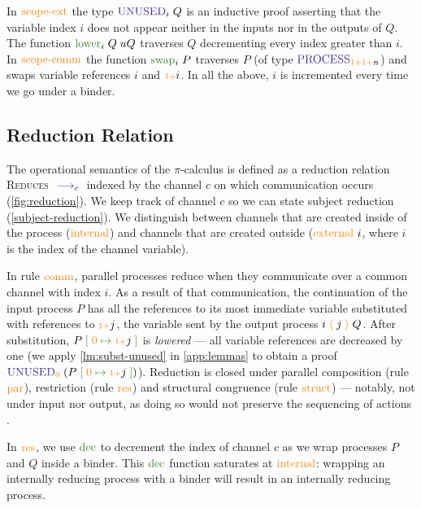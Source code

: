 \documentclass[a4paper,UKenglish,cleveref,autoref,thm-restate,authorcolumns]{lipics-v2019}
\theoremstyle{definition}
\newcommand{\picalc}{$\pi$-calculus}
\newcommand{\type}[1]{\textcolor{BlueViolet}{\operatorname{#1}}}
\newcommand{\constr}[1]{\textcolor{BurntOrange}{\operatorname{#1}}}
\newcommand{\func}[1]{\textcolor{OliveGreen}{\operatorname{#1}}}
\newcommand{\send}[2]{#1 \; \constr{\langle} \; #2 \;\constr{\rangle} \;}
\newcommand{\suc}{\constr{\scriptstyle 1+}}
\newcommand{\subst}[3]{#1 \; \func{[} \; #3 \; \func{\mapsto} \;#2 \; \func{]}}
\newcommand{\reduce}[1]{\; \type{\longrightarrow}_{#1} \;}
\newcommand{\Process}{\type{PROCESS}}
\newcommand{\Unused}{\type{UNUSED}}
\begin{document}
In $\constr{scope-ext}$ the type $\Unused_i \; Q$ is an inductive proof asserting that the variable index $i$ does not appear neither in the inputs nor in the outputs of $Q$.
The function $\func{lower}_i \; Q \; uQ$ traverses $Q$ decrementing every index greater than $i$.
In $\constr{scope-comm}$ the function $\func{swap}_i \; P$ traverses $P$ (of type $\Process_{\suc \suc n}$) and swaps variable references $i$ and $\suc i$.
In all the above, $i$ is incremented every time we go under a binder.
  
\subsection{Reduction Relation}
\label{operational-semantics}

The operational semantics of the \picalc{} is defined as a reduction relation \textsc{Reduces} $\reduce{c}$ indexed by the channel $c$ on which communication occurs (\autoref{fig:reduction}).
We keep track of channel $c$ so we can state subject reduction (\autoref{subject-reduction}).
We distinguish between channels that are created inside of the process ($\constr{internal}$) and channels that are created outside ($\constr{external}\ i$, where $i$ is the index of the channel variable).

In rule $\constr{comm}$, parallel processes reduce when they communicate over a common channel with index ${i}$.
As a result of that communication, the continuation of the input process $P$ has all the references to its most immediate variable substituted with references to $\suc j$, the variable sent by the output process $\send{i}{j}{Q}$.
After substitution, $\subst{P}{\suc j}{\constr{0}}$ is \emph{lowered} --- all variable references are decreased by one (we apply \autoref{lm:subst-unused} in \autoref{app:lemmas} to obtain a proof $\Unused_{\constr{0}} \; (\subst{P}{\suc j}{\constr{0}})$).
Reduction is closed under parallel composition (rule $\constr{par}$), restriction (rule $\constr{res}$) and structural congruence (rule $\constr{struct}$) 
--- notably, not under input nor output, as doing so would not preserve the sequencing of actions \cite{Sangio01}.


In $\constr{res}$, we use $\func{dec}$ to decrement the index of channel $c$ as we wrap processes $P$ and $Q$ inside a binder.
This $\func{dec}$ function saturates at $\constr{internal}$: wrapping an internally reducing process with a binder will result in an internally reducing process.
\end{document}
